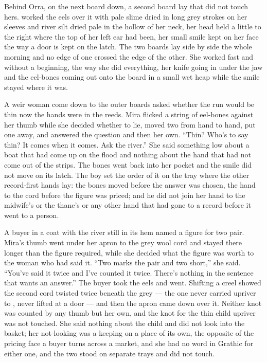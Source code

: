 \scenebreak

Behind Orra, on the next board down, a second board lay that did not touch hers.  worked the eels over it with pale slime dried in long grey strokes on her sleeves and river silt dried pale in the hollow of her neck, her head held a little to the right where the top of her left ear had been, her small smile kept on her face the way a door is kept on the latch. The two boards lay side by side the whole morning and no edge of one crossed the edge of the other. She worked fast and without a beginning, the way she did everything, her knife going in under the jaw and the eel-bones coming out onto the board in a small wet heap while the smile stayed where it was.

A weir woman come down to the outer boards asked whether the run would be thin now the hands were in the reeds. Mira flicked a string of eel-bones against her thumb while she decided whether to lie, moved two from hand to hand, put one away, and answered the question and then her own. “Thin? Who's to say thin? It comes when it comes. Ask the river.” She said something low about a boat that had come up on the flood and nothing about the hand that had not come out of the strips. The bones went back into her pocket and the smile did not move on its latch. The boy set the order of it on the tray where the other record-first hands lay: the bones moved before the answer was chosen, the hand to the cord before the figure was priced; and he did not join her hand to the midwife's or the thane's or any other hand that had gone to a record before it went to a person.

A buyer in a coat with the river still in its hem named a figure for two pair. Mira's thumb went under her apron to the grey wool cord and stayed there longer than the figure required, while she decided what the figure was worth to the woman who had said it. “Two marks the pair and two short,” she said. “You've said it twice and I've counted it twice. There's nothing in the sentence that wants an answer.” The buyer took the eels and went. Shifting a creel showed the second cord twisted twice beneath the grey --- the one never carried upriver to , never lifted at a door --- and then the apron came down over it. Neither knot was counted by any thumb but her own, and the knot for the thin child upriver was not touched. She said nothing about the child and did not look into the basket; her not-looking was a keeping on a place of its own, the opposite of the pricing face a buyer turns across a market, and she had no word in Grathic for either one, and the two stood on separate trays and did not touch.

